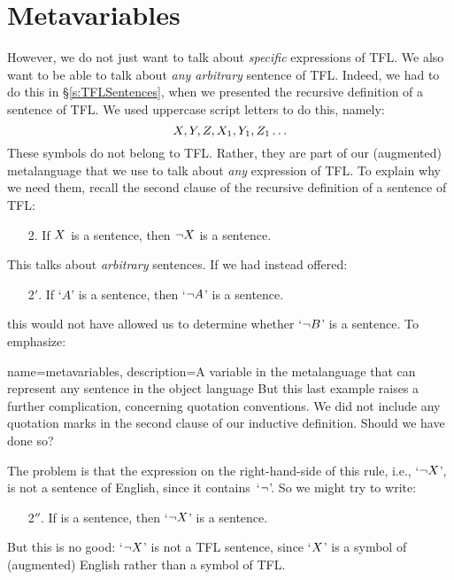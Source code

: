 \section{Metavariables}\label{s:Metavariables}
However, we do not just want to talk about \emph{specific} expressions of TFL. We also want to be able to talk about \emph{any arbitrary} sentence of TFL. Indeed, we had to do this in \S\ref{s:TFLSentences}, when we presented the recursive definition of a sentence of TFL. We used uppercase script letters to do this, namely:
	$$X, Y, Z,X_1,Y_1,Z_1\ldots$$
These symbols do not belong to TFL. Rather, they are part of our (augmented) metalanguage that we use to talk about \emph{any} expression of TFL. To explain why we need them, recall the second clause of the recursive definition of a sentence of TFL:
	\begin{itemize}
		\item[2.] If $X$ is a sentence, then $\neg X$ is a sentence.
	\end{itemize}
This talks about \emph{arbitrary} sentences. If we had instead offered:
	\begin{itemize}
		\item[2$'$.] If `$A$' is a sentence, then `$\neg A$' is a sentence.
	\end{itemize}
this would not have allowed us to determine whether `$\neg B$' is a sentence. To emphasize:

{
name=metavariables,
description={A variable in the metalanguage that can represent any sentence in the object language}
}
But this last example raises a further complication, concerning quotation conventions. We did not include any quotation marks in the second clause of our inductive definition. Should we have done so?

The problem is that the expression on the right-hand-side of this rule, i.e., `$\neg X$', is not a sentence of English, since it contains~`$\neg$'. So we might try to write:
	\begin{itemize}
		\item[2$''$.] If \metaX is a sentence, then `$\neg X$' is a sentence.
	\end{itemize}
But this is no good: `$\neg X$' is not a TFL sentence, since `$X$' is a symbol of (augmented) English rather than a symbol of TFL.

